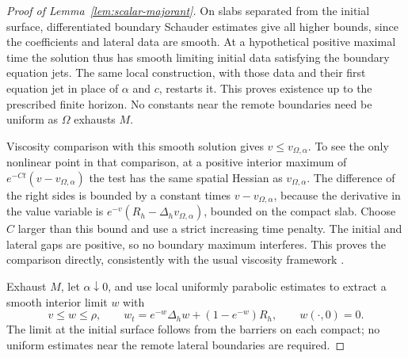 \begin{proof}[Proof of Lemma~\ref{lem:scalar-majorant}]
On slabs separated from the initial surface, differentiated
boundary Schauder estimates give all higher bounds, since the
coefficients and lateral data are smooth.  At a hypothetical
positive maximal time the solution thus has smooth limiting
initial data satisfying the boundary equation jets.  The same
local construction, with those data and their first equation jet
in place of $\alpha$ and $c$, restarts it.  This proves existence
up to the prescribed finite horizon.  No constants near the
remote boundaries need be uniform as $\Omega$ exhausts $M$.

Viscosity comparison with this smooth solution gives
$v\le v_{\Omega,\alpha}$.  To see the only nonlinear point in that
comparison, at a positive interior maximum of
$e^{-Ct}(v-v_{\Omega,\alpha})$ the test has the same spatial Hessian
as $v_{\Omega,\alpha}$.  The difference of the right sides is bounded
by a constant times $v-v_{\Omega,\alpha}$, because the derivative
in the value variable is
$e^{-v}(R_h-\Delta_hv_{\Omega,\alpha})$, bounded on the compact slab.
Choose $C$ larger than this bound and use a strict increasing time
penalty.  The initial and lateral gaps are positive, so no boundary
maximum interferes.  This proves the comparison directly, consistently
with the usual viscosity framework \cite{CIL}.

Exhaust $M$, let $\alpha\downarrow0$, and use local uniformly
parabolic estimates to extract a smooth interior limit $w$ with
\[
 v\le w\le\rho,\qquad
 w_t=e^{-w}\Delta_hw+(1-e^{-w})R_h,
 \qquad w(\cdot,0)=0.
\]
The limit at the initial surface follows from the barriers on each
compact; no uniform estimates near the remote lateral boundaries
are required.
\end{proof}
